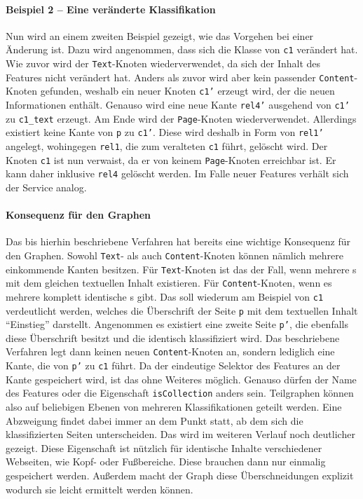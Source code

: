     \paragraph{Beispiel 2 -- Eine veränderte Klassifikation}
    Nun wird an einem zweiten Beispiel gezeigt,
    wie das Vorgehen bei einer Änderung ist.
    Dazu wird angenommen, dass sich die Klasse von \texttt{c1} verändert hat.
    Wie zuvor wird der \texttt{Text}-Knoten wiederverwendet,
    da sich der Inhalt des Features nicht verändert hat.
    Anders als zuvor wird aber kein passender \texttt{Content}-Knoten gefunden,
    weshalb ein neuer Knoten \texttt{c1'} erzeugt wird, der die neuen Informationen enthält.
    Genauso wird eine neue Kante \texttt{rel4'} ausgehend von \texttt{c1'} zu \texttt{c1\_text} erzeugt.
    Am Ende wird der \texttt{Page}-Knoten wiederverwendet.
    Allerdings existiert keine Kante von \texttt{p} zu \texttt{c1'}.
    Diese wird deshalb in Form von \texttt{rel1'} angelegt,
    wohingegen \texttt{rel1}, die zum veralteten \texttt{c1} führt, gelöscht wird.
    Der Knoten \texttt{c1} ist nun verwaist, da er von keinem \texttt{Page}-Knoten erreichbar ist.
    Er kann daher inklusive \texttt{rel4} gelöscht werden.
    Im Falle neuer Features verhält sich der Service analog.

    \paragraph{Konsequenz für den Graphen}
    Das bis hierhin beschriebene Verfahren hat bereits eine wichtige
    Konsequenz für den Graphen.
    Sowohl \texttt{Text}- als auch \texttt{Content}-Knoten können nämlich mehrere einkommende Kanten besitzen.
    Für \texttt{Text}-Knoten ist das der Fall, wenn mehrere {\contentFeature}s mit dem gleichen textuellen Inhalt existieren.
    Für \texttt{Content}-Knoten, wenn es mehrere komplett identische {\contentFeature}s gibt.
    Das soll wiederum am Beispiel von \texttt{c1} verdeutlicht werden,
    welches die Überschrift der Seite \texttt{p} mit dem textuellen Inhalt "`Einstieg"' darstellt.
    Angenommen es existiert eine zweite Seite \texttt{p'},
    die ebenfalls diese Überschrift besitzt und die identisch klassifiziert wird.
    Das beschriebene Verfahren legt dann keinen neuen \texttt{Content}-Knoten an,
    sondern lediglich eine Kante, die von \texttt{p'} zu \texttt{c1} führt.
    Da der eindeutige Selektor des Features an der Kante gespeichert wird, ist das ohne Weiteres möglich.
    Genauso dürfen der Name des Features oder die Eigenschaft \texttt{isCollection} anders sein.
    Teilgraphen können also auf beliebigen Ebenen von mehreren Klassifikationen geteilt werden.
    Eine Abzweigung findet dabei immer an dem Punkt statt,
    ab dem sich die klassifizierten Seiten unterscheiden.
    Das wird im weiteren Verlauf noch deutlicher gezeigt.    
    Diese Eigenschaft ist nützlich für identische Inhalte
    verschiedener Webseiten, wie Kopf- oder Fußbereiche.
    Diese brauchen dann nur einmalig gespeichert werden.
    Außerdem macht der Graph diese Überschneidungen explizit wodurch sie leicht
    ermittelt werden können.

